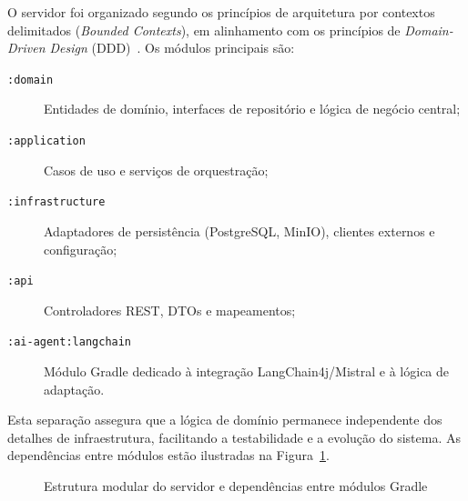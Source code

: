 O servidor foi organizado segundo os princípios de arquitetura por contextos delimitados (\textit{Bounded Contexts}), em alinhamento com os princípios de \textit{Domain-Driven Design} (DDD)~\cite{evans2003ddd}. Os módulos principais são:

\begin{description}
  \item[\texttt{:domain}] Entidades de domínio, interfaces de repositório e lógica de negócio central;
  \item[\texttt{:application}] Casos de uso e serviços de orquestração;
  \item[\texttt{:infrastructure}] Adaptadores de persistência (PostgreSQL, MinIO), clientes externos e configuração;
  \item[\texttt{:api}] Controladores REST, DTOs e mapeamentos;
  \item[\texttt{:ai-agent:langchain}] Módulo Gradle dedicado à integração LangChain4j/Mistral e à lógica de adaptação.
\end{description}

Esta separação assegura que a lógica de domínio permanece independente dos detalhes de infraestrutura, facilitando a testabilidade e a evolução do sistema. As dependências entre módulos estão ilustradas na Figura~\ref{fig:modulos}.

\begin{figure}[htbp]
  \centering
  \caption{Estrutura modular do servidor e dependências entre módulos Gradle}
  \label{fig:modulos}
\end{figure}

